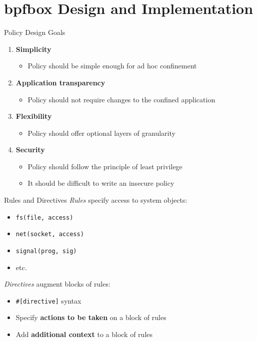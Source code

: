 \documentclass[12pt, dvipsnames, aspectratio=169]{beamer}
\begin{document}
\section{bpfbox Design and Implementation}

\begin{frame}[c]{Policy Design Goals}
\begin{enumerate}
    \item \textbf{Simplicity}
    \begin{itemize}
        \item Policy should be simple enough for ad hoc confinement
    \end{itemize}
    \vfill
    \item \textbf{Application transparency}
    \begin{itemize}
        \item Policy should not require changes to the confined application
    \end{itemize}
    \vfill
    \item \textbf{Flexibility}
    \begin{itemize}
        \item Policy should offer optional layers of granularity
    \end{itemize}
    \vfill
    \item \textbf{Security}
    \begin{itemize}
        \item Policy should follow the principle of least privilege
        \item It should be difficult to write an insecure policy
    \end{itemize}
\end{enumerate}
\end{frame}

\begin{frame}[c, fragile]{Rules and Directives}
\textit{Rules} specify access to system objects:
\begin{itemize}
    \item \lstinline[language=bpfbox]|fs(file, access)|
    \item \lstinline[language=bpfbox]|net(socket, access)|
    \item \lstinline[language=bpfbox]|signal(prog, sig)|
    \item etc.
\end{itemize}

\vfill
\textit{Directives} augment blocks of rules:
\begin{itemize}
    \item \lstinline[language=bpfbox]|#[directive]| syntax
    \item Specify \textbf{actions to be taken} on a block of rules
    \item Add \textbf{additional context} to a block of rules
\end{itemize}
\end{frame}
\end{document}
